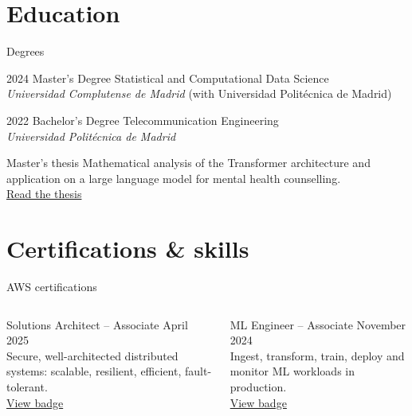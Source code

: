 \documentclass[10pt]{beamer}
\begin{document}
\section{Education}

\begin{frame}{Degrees}
  \begin{block}{2024 \textperiodcentered{} Master's Degree}
    Statistical and Computational Data Science\\
    \textit{Universidad Complutense de Madrid}
    (with Universidad Polit\'ecnica de Madrid)
  \end{block}

  \begin{exampleblock}{2022 \textperiodcentered{} Bachelor's Degree}
    Telecommunication Engineering\\
    \textit{Universidad Polit\'ecnica de Madrid}
  \end{exampleblock}

  \begin{alertblock}{Master's thesis}
    Mathematical analysis of the Transformer architecture and application on
    a large language model for mental health counselling.\\
    \href{https://docta.ucm.es/entities/publication/093fac7e-17fa-4d56-94ab-c984067ad3ac}{Read the thesis}
  \end{alertblock}
\end{frame}

\section{Certifications \& skills}

\begin{frame}{AWS certifications}
  \begin{columns}[T,onlytextwidth]
      \begin{block}{Solutions Architect -- Associate}
        April 2025\\
        Secure, well-architected distributed systems: scalable, resilient,
        efficient, fault-tolerant.\\[0.4em]
        {\small\href{https://www.credly.com/badges/f1549694-8ebf-489b-882d-4cad12fa593a/public_url}{View badge}}
      \end{block}
      \begin{exampleblock}{ML Engineer -- Associate}
        November 2024\\
        Ingest, transform, train, deploy and monitor ML workloads in
        production.\\[0.4em]
        {\small\href{https://www.credly.com/badges/94609834-c001-4dec-b8aa-c07957444f1e/public_url}{View badge}}
      \end{exampleblock}
  \end{columns}
\end{frame}
\end{document}
